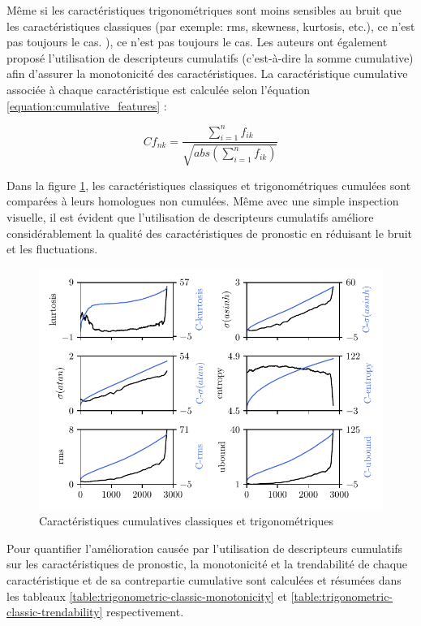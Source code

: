 Même si les caractéristiques trigonométriques sont moins sensibles au bruit que les caractéristiques classiques (par exemple: rms, skewness, kurtosis, etc.), ce n'est pas toujours le cas. ), ce n'est pas toujours le cas. Les auteurs ont également proposé l'utilisation de descripteurs cumulatifs (c'est-à-dire la somme cumulative) afin d'assurer la monotonicité des caractéristiques. La caractéristique cumulative associée à chaque caractéristique est calculée selon l'équation \ref{equation:cumulative_features} :

\begin{equation}
Cf_{nk} = \frac{\sum_{i=1}^n f_{ik}} {\sqrt{abs\left(\sum_{i=1}^nf_{ik}\right)}}
\label{equation:cumulative_features}
\end{equation}

Dans la figure \ref{fig:trig_classic_cumulative_features}, les caractéristiques classiques et trigonométriques cumulées sont comparées à leurs homologues non cumulées. Même avec une simple inspection visuelle, il est évident que l'utilisation de descripteurs cumulatifs améliore considérablement la qualité des caractéristiques de pronostic en réduisant le bruit et les fluctuations.

\begin{figure}[H]
	\centering
	\includegraphics[width=0.8\linewidth]{figures/trig_classic_cumulative_features.pdf}
	\caption{Caractéristiques cumulatives classiques et trigonométriques}%
	\label{fig:trig_classic_cumulative_features}
\end{figure}

Pour quantifier l'amélioration causée par l'utilisation de descripteurs cumulatifs sur les caractéristiques de pronostic, la monotonicité et la trendabilité de chaque caractéristique et de sa contrepartie cumulative sont calculées et résumées dans les tableaux \ref{table:trigonometric-classic-monotonicity} et \ref{table:trigonometric-classic-trendability} respectivement.

